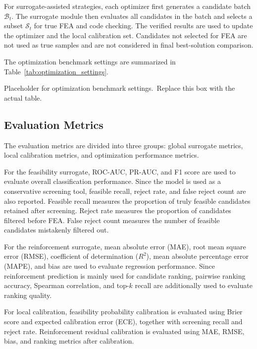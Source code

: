 For surrogate-assisted strategies, each optimizer first generates a candidate batch $\mathcal{B}_t$. The surrogate module then evaluates all candidates in the batch and selects a subset $\mathcal{S}_t$ for true FEA and code checking. The verified results are used to update the optimizer and the local calibration set. Candidates not selected for FEA are not used as true samples and are not considered in final best-solution comparison.

The optimization benchmark settings are summarized in Table~\ref{tab:optimization_settings}.

\begin{table}[t]
\centering
\caption{Optimization benchmark settings and compared candidate evaluation strategies.}
\label{tab:optimization_settings}
\begin{minipage}[c][0.18\textheight][c]{0.92\textwidth}
\centering
Placeholder for optimization benchmark settings.\
Replace this box with the actual table.
\end{minipage}
\end{table}

\subsection{Evaluation Metrics}
\label{subsec:evaluation_metrics}

The evaluation metrics are divided into three groups: global surrogate metrics, local calibration metrics, and optimization performance metrics.

For the feasibility surrogate, ROC-AUC, PR-AUC, and F1 score are used to evaluate overall classification performance. Since the model is used as a conservative screening tool, feasible recall, reject rate, and false reject count are also reported. Feasible recall measures the proportion of truly feasible candidates retained after screening. Reject rate measures the proportion of candidates filtered before FEA. False reject count measures the number of feasible candidates mistakenly filtered out.

For the reinforcement surrogate, mean absolute error (MAE), root mean square error (RMSE), coefficient of determination ($R^2$), mean absolute percentage error (MAPE), and bias are used to evaluate regression performance. Since reinforcement prediction is mainly used for candidate ranking, pairwise ranking accuracy, Spearman correlation, and top-$k$ recall are additionally used to evaluate ranking quality.

For local calibration, feasibility probability calibration is evaluated using Brier score and expected calibration error (ECE), together with screening recall and reject rate. Reinforcement residual calibration is evaluated using MAE, RMSE, bias, and ranking metrics after calibration.

